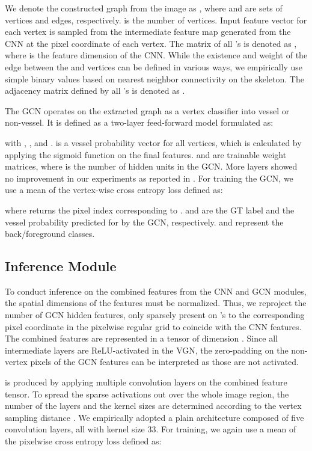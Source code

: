 \documentclass[runningheads,a4paper]{llncs}
\begin{document}
We denote the constructed graph from the image  as , where  and  are sets of vertices and edges, respectively.  is the number of vertices. Input feature vector  for each vertex is sampled from the intermediate feature map generated from the CNN at the pixel coordinate of each vertex. The matrix of all 's is denoted as , where  is the feature dimension of the CNN. While the existence and weight of the edge  between the  and  vertices can be defined in various ways, we empirically use simple binary values based on nearest neighbor connectivity on the skeleton. The adjacency matrix defined by all 's is denoted as .

The GCN operates on the extracted graph as a vertex classifier into vessel or non-vessel. It is defined as a two-layer feed-forward model formulated as:

   
with , , and .  is a vessel probability vector for all vertices, which is calculated by applying the sigmoid function  on the final features.  and  are trainable weight matrices, where  is the number of hidden units in the GCN. More layers showed no improvement in our experiments as reported in \cite{kipf17}. For training the GCN, we use a mean of the vertex-wise cross entropy loss defined as:


where  returns the pixel index corresponding to .   and  are the GT label and the vessel probability predicted for  by the GCN, respectively.  and  represent the back/foreground classes. 

\subsection{Inference Module}\label{infer_module}

To conduct inference on the combined features from the CNN and GCN modules, the spatial dimensions of the features must be normalized. Thus, we reproject the  number of GCN hidden features, only sparsely present on 's to the corresponding pixel coordinate in the pixelwise regular grid to coincide with the CNN features. The combined features are represented in a tensor of dimension . Since all intermediate layers are ReLU-activated in the VGN, the zero-padding on the non-vertex pixels of the GCN features can be interpreted as those are not activated.

 is produced by applying multiple convolution layers on the combined feature tensor. To spread the sparse activations out over the whole image region, the number of the layers and the kernel sizes are determined according to the vertex sampling distance . We empirically adopted a plain architecture composed of five convolution layers, all with kernel size 33. For training, we again use a mean of the pixelwise cross entropy loss defined as:
\end{document}
